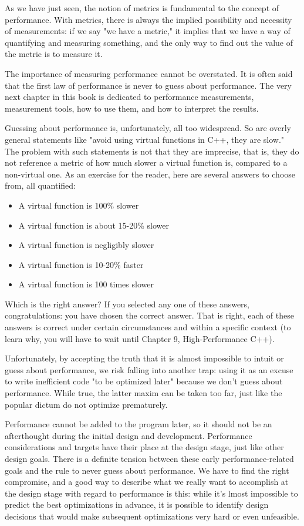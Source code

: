 As we have just seen, the notion of metrics is fundamental to the concept of performance. With metrics, there is always the implied possibility and necessity of measurements: if we say "we have a metric," it implies that we have a way of quantifying and measuring something, and the only way to find out the value of the metric is to measure it.

The importance of measuring performance cannot be overstated. It is often said that the first law of performance is never to guess about performance. The very next chapter in this book is dedicated to performance measurements, measurement tools, how to use them, and how to interpret the results.

Guessing about performance is, unfortunately, all too widespread. So are overly general statements like "avoid using virtual functions in C++, they are slow." The problem with such statements is not that they are imprecise, that is, they do not reference a metric of how much slower a virtual function is, compared to a non-virtual one. As an exercise for the reader, here are several answers to choose from, all quantified:

\begin{itemize}
\item A virtual function is 100\% slower
\item A virtual function is about 15-20\% slower
\item A virtual function is negligibly slower
\item A virtual function is 10-20\% faster
\item A virtual function is 100 times slower
\end{itemize}

Which is the right answer? If you selected any one of these answers, congratulations: you have chosen the correct answer. That is right, each of these answers is correct under certain circumstances and within a specific context (to learn why, you will have to wait until Chapter 9, High-Performance C++).

Unfortunately, by accepting the truth that it is almost impossible to intuit or guess about performance, we risk falling into another trap: using it as an excuse to write inefficient code "to be optimized later" because we don't guess about performance. While true, the latter maxim can be taken too far, just like the popular dictum do not optimize prematurely.

Performance cannot be added to the program later, so it should not be an afterthought during the initial design and development. Performance considerations and targets have their place at the design stage, just like other design goals. There is a definite tension between these early performance-related goals and the rule to never guess about performance. We have to find the right compromise, and a good way to describe what we really want to accomplish at the design stage with regard to performance is this: while it's lmost impossible to predict the best optimizations in advance, it is possible to identify design decisions that would make subsequent optimizations very hard or even unfeasible.

